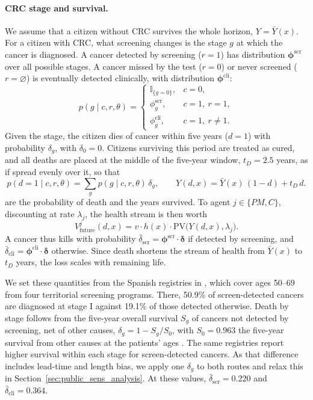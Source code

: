 \documentclass[12pt]{article}
\begin{document}
\paragraph{CRC stage and survival.} We assume that a citizen without CRC survives the whole horizon, $Y = \bar Y(x)$. For a citizen with CRC, what screening changes is the stage $g$ at which the cancer is diagnosed. A cancer detected by screening ($r=1$) has distribution $\boldsymbol{\phi}^{\text{scr}}$ over all possible stages. A cancer missed by the test ($r=0$) or never screened ($r = \varnothing$) is eventually detected clinically, with distribution $\boldsymbol{\phi}^{\text{cli}}$:
\begin{equation}\label{eq:stage}
p(g \mid c, r, \theta) =
\begin{cases}
\mathbb{I}_{\{g = 0\}}, & c = 0,\\
\phi^{\text{scr}}_g, & c = 1,\ r = 1,\\
\phi^{\text{cli}}_g, & c = 1,\ r \neq 1.
\end{cases}
\end{equation}
Given the stage, the citizen dies of cancer within five years ($d=1$) with probability $\delta_g$, with $\delta_0 = 0$. Citizens surviving this period are treated as cured, and all deaths are placed at the middle of the five-year window, $t_D=2.5$ years, as if spread evenly over it, so that
\begin{equation}\label{eq:qdeath}
p(d = 1 \mid c, r, \theta) = \sum_{g} p(g \mid c, r, \theta)\, \delta_g,
\qquad
Y(d,x) = \bar Y(x)\,(1 - d) + t_D\, d .
\end{equation}
are the probability of death and the years survived. To agent $j \in \{PM, C\}$, discounting at rate $\lambda_j$, the health stream is then worth
\begin{equation}\label{eq:vfuture}
V^{j}_{\text{future}}(d, x) = v \cdot h(x) \cdot \mathrm{PV}\big(Y(d,x), \lambda_j\big).
\end{equation}
A cancer thus kills with probability $\bar\delta_{\text{scr}} = \boldsymbol{\phi}^{\text{scr}} \cdot \boldsymbol{\delta}$ if detected by screening, and $\bar\delta_{\text{cli}} = \boldsymbol{\phi}^{\text{cli}} \cdot \boldsymbol{\delta}$ otherwise. Since death shortens the stream of health from $\bar Y(x)$ to $t_D$ years, the loss scales with remaining life.

We set these quantities from the Spanish registries in \citet{cardoso2022overall}, which cover ages 50--69 from four territorial screening programs. There, 50.9\% of screen-detected cancers are diagnosed at stage I against 19.1\% of those detected otherwise. Death by stage follows from the five-year overall survival $S_g$ of cancers not detected by screening, net of other causes, $\delta_g = 1 - S_g/S_0$, with $S_0 = 0.963$ the five-year survival from other causes at the patients' ages \citep{ine2024mortalidad}. The same registries report higher survival within each stage for screen-detected cancers. As that difference includes lead-time and length bias, we apply one $\delta_g$ to both routes and relax this in Section~\ref{sec:public_sens_analysis}. At these values, $\bar\delta_{\text{scr}} = 0.220$ and $\bar\delta_{\text{cli}} = 0.364$.
\end{document}
